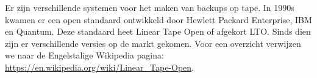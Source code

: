 Er zijn verschillende systemen voor het maken van backups op tape. In 1990s kwamen er een open standaard ontwikkeld door Hewlett Packard Enterprise, IBM en Quantum. Deze standaard heet Linear Tape Open of afgekort LTO. Sinds dien zijn er verschillende versies op de markt gekomen. Voor een overzicht verwijzen we naar de Engelstalige Wikipedia pagina: \url{https://en.wikipedia.org/wiki/Linear_Tape-Open}.

